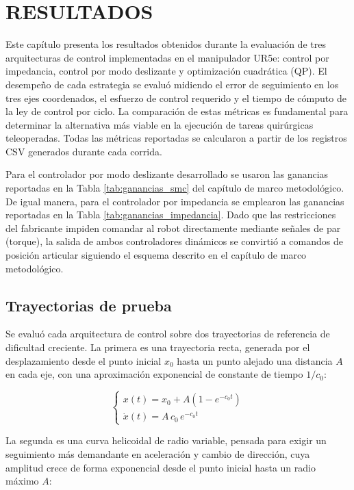 \chapter{RESULTADOS}

Este capítulo presenta los resultados obtenidos durante la evaluación de tres
arquitecturas de control implementadas en el manipulador UR5e: control por
impedancia, control por modo deslizante y optimización cuadrática (QP). El
desempeño de cada estrategia se evaluó midiendo el error de seguimiento en los
tres ejes coordenados, el esfuerzo de control requerido y el tiempo de cómputo
de la ley de control por ciclo. La comparación de estas métricas es
fundamental para determinar la alternativa más viable en la ejecución de
tareas quirúrgicas teleoperadas. Todas las métricas reportadas se calcularon a
partir de los registros CSV generados durante cada corrida.

Para el controlador por modo deslizante desarrollado se usaron las ganancias
reportadas en la Tabla \ref{tab:ganancias_smc} del capítulo de marco
metodológico. De igual manera, para el controlador por impedancia se
emplearon las ganancias reportadas en la Tabla \ref{tab:ganancias_impedancia}.
Dado que las restricciones del fabricante impiden comandar al robot
directamente mediante señales de par (torque), la salida de ambos
controladores dinámicos se convirtió a comandos de posición articular
siguiendo el esquema descrito en el capítulo de marco metodológico.

\section{Trayectorias de prueba}

Se evaluó cada arquitectura de control sobre dos trayectorias de referencia
de dificultad creciente. La primera es una trayectoria recta, generada por el
desplazamiento desde el punto inicial \(x_0\) hasta un punto alejado una
distancia \(A\) en cada eje, con una aproximación exponencial de constante de
tiempo \(1/c_0\):

\begin{equation}
    \begin{cases}
        x(t) = x_0+A\left(1-e^{-c_0 t}\right) \\
        \dot{x}(t) = A\, c_0\, e^{-c_0 t}
    \end{cases}
\end{equation}

La segunda es una curva helicoidal de radio variable, pensada para exigir un
seguimiento más demandante en aceleración y cambio de dirección, cuya
amplitud crece de forma exponencial desde el punto inicial hasta un radio
máximo \(A\):

